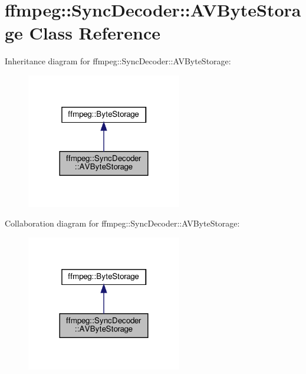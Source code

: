 \hypertarget{classffmpeg_1_1SyncDecoder_1_1AVByteStorage}{}\section{ffmpeg\+:\+:Sync\+Decoder\+:\+:A\+V\+Byte\+Storage Class Reference}
\label{classffmpeg_1_1SyncDecoder_1_1AVByteStorage}


Inheritance diagram for ffmpeg\+:\+:Sync\+Decoder\+:\+:A\+V\+Byte\+Storage\+:
\nopagebreak
\begin{figure}[H]
\begin{center}
\leavevmode
\includegraphics[width=192pt]{classffmpeg_1_1SyncDecoder_1_1AVByteStorage__inherit__graph}
\end{center}
\end{figure}


Collaboration diagram for ffmpeg\+:\+:Sync\+Decoder\+:\+:A\+V\+Byte\+Storage\+:
\nopagebreak
\begin{figure}[H]
\begin{center}
\leavevmode
\includegraphics[width=192pt]{classffmpeg_1_1SyncDecoder_1_1AVByteStorage__coll__graph}
\end{center}
\end{figure}
